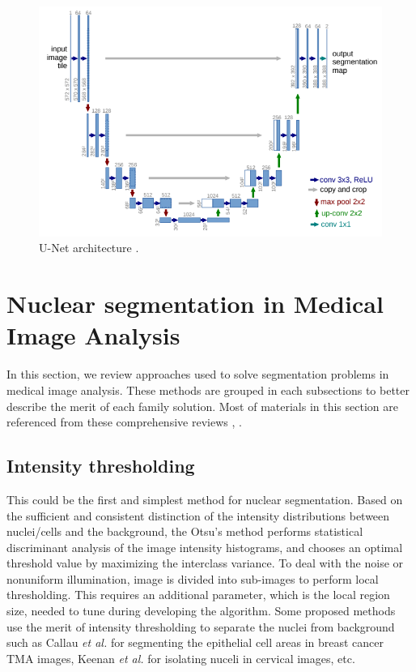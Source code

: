 \begin{figure}[thb]
    \centering
    \includegraphics[width=\textwidth]{resources/3_u_net.png}
    \caption{U-Net architecture \cite{unet}.}
    \label{fig:u_net}
\end{figure}

\section{Nuclear segmentation in Medical Image Analysis}

In this section, we review approaches used to solve segmentation problems in medical image analysis. These methods are grouped in each subsections to better describe the merit of each family solution. Most of materials in this section are referenced from these comprehensive reviews \cite{review_seg_overall}, \cite{survey_on_medical_image_analysis}. 

\subsection{Intensity thresholding}
This could be the first and simplest method for nuclear segmentation. Based on the sufficient and consistent distinction of the intensity distributions between nuclei/cells and the background, the Otsu’s method \cite{Otsu} performs statistical discriminant analysis of the image intensity histograms, and chooses an optimal threshold value by maximizing the interclass variance. To deal with the noise or nonuniform illumination, image is divided into sub-images to perform local thresholding. This requires an additional parameter, which is the local region size, needed to tune during developing the algorithm. Some proposed methods use the merit of intensity thresholding to separate the nuclei from background such as Callau \textit{et al.} \cite{Callau2015} for segmenting the epithelial cell areas in breast cancer TMA images, Keenan \textit{et al.} \cite{Keenan2000AnAM} for isolating nuceli in cervical images, etc. 

